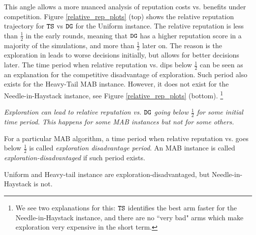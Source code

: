 \documentclass[../competing_bandits.tex]{subfiles}
\begin{document}
This angle allows a more nuanced analysis of reputation costs vs. benefits under competition. Figure \ref{relative_rep_plots} (top) shows the relative reputation trajectory for $\mathtt{TS}$ vs $\mathtt{DG}$ for the Uniform instance. The relative reputation is less than $\tfrac12$ in the early rounds, meaning that $\mathtt{DG}$ has a higher reputation score in a majority of the simulations, and more than $\tfrac12$ later on. The reason is the exploration in \TS leads to worse decisions initially, but allows for better decisions later. The time period when relative reputation vs. \DG dips below $\tfrac12$ can be seen as an explanation for the competitive disadvantage of exploration. Such period also exists for the Heavy-Tail MAB instance. However, it does not exist for the Needle-in-Haystack instance, see Figure \ref{relative_rep_plots} (bottom).%
\footnote{We see two explanations for this: $\mathtt{TS}$ identifies the best arm faster for the Needle-in-Haystack instance, and there are no ``very bad" arms which make exploration very expensive in the short term.}


\begin{finding}\label{find:period}
\textit{Exploration can lead to relative reputation vs. $\mathtt{DG}$ going below $\tfrac12$ for some initial time period. This happens for some MAB instances but not for some others.}
\end{finding}

\begin{definition}
For a particular MAB algorithm, a time period when relative reputation vs. \DG goes below $\tfrac12$ is called {\em exploration disadvantage period}. An MAB instance is called \emph{exploration-disadvantaged} if such period exists.
\end{definition}

\noindent Uniform and Heavy-tail instance are exploration-disadvantaged, but Needle-in-Haystack is not.
\end{document}

